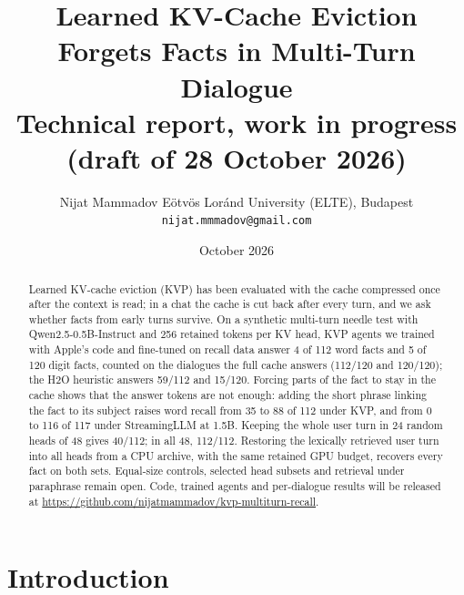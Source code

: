 \documentclass[11pt,a4paper]{article}
\title{\vspace{-1.7cm}\Large Learned KV-Cache Eviction Forgets Facts in Multi-Turn Dialogue\\[0.2em]
  \large Technical report, work in progress (draft of 28 October 2026)}
\author{Nijat Mammadov \quad \small Eötvös Loránd University (ELTE), Budapest \quad \texttt{nijat.mmmadov@gmail.com}}
\date{\vspace{-0.6em}October 2026\vspace{-0.8em}}
\begin{document}
\maketitle

\begin{abstract}
\noindent Learned KV-cache eviction (KVP) has been evaluated with the cache compressed once after the context is read; in a chat the cache is cut back after every turn, and we ask whether facts from early turns survive.
On a synthetic multi-turn needle test with Qwen2.5-0.5B-Instruct and 256 retained tokens per KV head, KVP agents we trained with Apple's code and fine-tuned on recall data answer 4 of 112 word facts and 5 of 120 digit facts, counted on the dialogues the full cache answers (112/120 and 120/120); the H2O heuristic answers 59/112 and 15/120.
Forcing parts of the fact to stay in the cache shows that the answer tokens are not enough: adding the short phrase linking the fact to its subject raises word recall from 35 to 88 of 112 under KVP, and from 0 to 116 of 117 under StreamingLLM at 1.5B.
Keeping the whole user turn in 24 random heads of 48 gives 40/112; in all 48, 112/112.
Restoring the lexically retrieved user turn into all heads from a CPU archive, with the same retained GPU budget, recovers every fact on both sets.
Equal-size controls, selected head subsets and retrieval under paraphrase remain open.
Code, trained agents and per-dialogue results will be released at \url{https://github.com/nijatmammadov/kvp-multiturn-recall}.
\end{abstract}

\section{Introduction}
\end{document}
